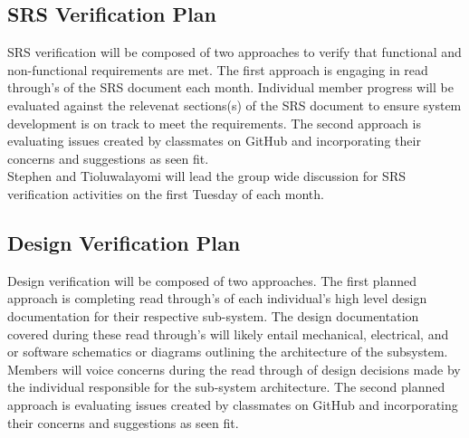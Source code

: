 \documentclass[12pt, titlepage]{article}
\begin{document}
\subsection{SRS Verification Plan}



SRS verification will be composed of two approaches to verify that functional and non-functional requirements are met. The first approach is engaging in read through's of the SRS document each month. Individual member progress will be evaluated against the relevenat sections(s) of the SRS document to ensure system  development is on track to meet the requirements. The second approach is evaluating issues created by classmates on GitHub and incorporating their concerns and suggestions as seen fit.\\

Stephen and Tioluwalayomi will lead the group wide discussion for SRS verification activities on the first Tuesday of each month.\\

\subsection{Design Verification Plan}




Design verification will be composed of two approaches. The first planned approach is completing read through's of each individual's high level design documentation for their respective sub-system. The design documentation covered during these read through's will likely entail mechanical, electrical, and or software schematics or diagrams outlining the architecture of the subsystem. Members will voice concerns during the read through of design decisions made by the individual responsible for the sub-system architecture. The second planned approach is evaluating issues created by classmates on GitHub and incorporating their concerns and suggestions as seen fit.\\
\end{document}
